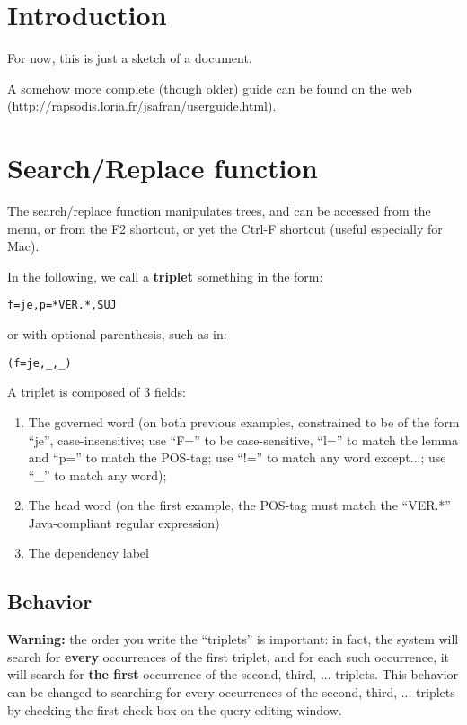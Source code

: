 \documentclass{article}
\begin{document}
\section{Introduction}
For now, this is just a sketch of a document.

A somehow more complete (though older) guide can be found on the web (\url{http://rapsodis.loria.fr/jsafran/userguide.html}).

\section{Search/Replace function}

The search/replace function manipulates trees, and can be accessed from the menu,
or from the F2 shortcut, or yet the Ctrl-F shortcut (useful especially for Mac).

In the following, we call a {\bf triplet} something in the form:
\begin{verbatim}
f=je,p=*VER.*,SUJ
\end{verbatim}
or with optional parenthesis, such as in:
\begin{verbatim}
(f=je,_,_)
\end{verbatim}

A triplet is composed of 3 fields:
\begin{enumerate}
\item The governed word (on both previous examples, constrained to be of the form ``je'', case-insensitive; use ``F='' to be case-sensitive, ``l='' to match the lemma and ``p='' to match the POS-tag; use ``!='' to match any word except...; use ``\_'' to match any word);
\item The head word (on the first example, the POS-tag must match the ``VER.*'' Java-compliant regular expression)
\item The dependency label
\end{enumerate}

\subsection{Behavior}

{\bf Warning:} the order you write the ``triplets'' is important:
in fact, the system will search for {\bf every} occurrences of the first triplet,
and for each such occurrence, it will search for {\bf the first} occurrence of the second,
third, ... triplets.
This behavior can be changed to searching for every occurrences of the second, third, ...
triplets by checking the first check-box on the query-editing window.
\end{document}
